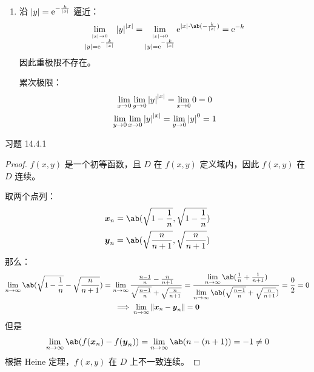 \begin{problem}
\begin{solution}
\begin{enumerate}
            累次极限：
            $$
            \begin{gathered}
                \lim_{x \to 0} \lim_{y \to 0} f(x, y) = \lim_{x \to 0} \frac{x^2}{x^2} = 1 \\
                \lim_{y \to 0} \lim_{x \to 0} f(x, y) = \lim_{y \to 0} \frac{y^2}{y^2} = 1
            \end{gathered}
            $$

            \item[\textbf{9)}] 沿 $\abs{y} = \mathrm{e}^{-\frac{k}{\abs{x}}}$ 逼近：
            $$
            \lim_{\stackrel{\abs{x} \to 0}{\abs{y} = \E^{-\frac{k}{\abs{x}}}}} \abs{y}^{\abs{x}} = \lim_{\stackrel{\abs{x} \to 0}{\abs{y} = \E^{-\frac{k}{\abs{x}}}}} \E^{\abs{x} \cdot \ab(-\frac{k}{\abs{x}})} = \E^{-k}
            $$
            因此重极限不存在。

            累次极限：
            $$
            \begin{gathered}
                \lim_{x \to 0} \lim_{y \to 0} \abs{y}^{\abs{x}} = \lim_{x \to 0} 0 = 0 \\
                \lim_{y \to 0} \lim_{x \to 0} \abs{y}^{\abs{x}} = \lim_{y \to 0} \abs{y}^{0} = 1
            \end{gathered}
            $$
        \end{enumerate}
    \end{solution}
\end{problem}

\begin{problem}
    习题 14.4.1
    \begin{proof}
        $f(x, y)$ 是一个初等函数，且 $D$ 在 $f(x, y)$ 定义域内，因此 $f(x, y)$ 在 $D$ 连续。

        取两个点列：
        $$
        \begin{gathered}
            \vect{x}_n = \ab(\sqrt{1 - \frac{1}{n}}, \sqrt{1 - \frac{1}{n}}) \\
            \vect{y}_n = \ab(\sqrt{\frac{n}{n + 1}}, \sqrt{\frac{n}{n + 1}})
        \end{gathered}
        $$
        那么：
        $$
        \begin{gathered}
            \lim_{n \to \infty} \ab(\sqrt{1 - \frac{1}{n}} - \sqrt{\frac{n}{n + 1}}) = \lim_{n \to \infty} \frac{\frac{n - 1}{n} - \frac{n}{n + 1}}{\sqrt{\frac{n - 1}{n}} + \sqrt{{\frac{n}{n + 1}}}} = \frac{\lim\limits_{n \to \infty} \ab(\frac{1}{n} + \frac{1}{n + 1})}{\lim\limits_{n \to \infty} \ab(\sqrt{\frac{n - 1}{n}} + \sqrt{\frac{n}{n + 1}})} = \frac{0}{2} = 0 \\
            \implies \lim_{n \to \infty} \norm{\vect{x}_n - \vect{y}_n} = \vect{0}
        \end{gathered}
        $$
        但是
        $$
        \begin{gathered}
            \lim_{n \to \infty} \ab(f(\vect{x}_n) - f(\vect{y}_n)) = \lim_{n \to \infty} \ab(n - (n + 1)) = -1 \neq 0
        \end{gathered}
        $$
        根据 Heine 定理，$f(x, y)$ 在 $D$ 上不一致连续。
    \end{proof}
\end{problem}

